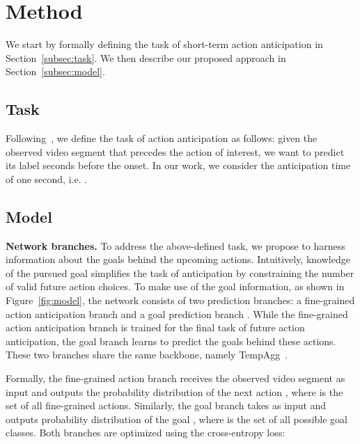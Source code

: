 \documentclass{article}
\begin{document}
\vspace{-0.2cm}
\section{Method}
\vspace{-0.1cm}
\label{sec:method}
We start by formally defining the task of short-term action anticipation in Section~\ref{subsec:task}. We then describe our proposed approach in Section~\ref{subsec:model}. 
\vspace{-0.3cm}
\subsection{Task}
\vspace{-0.1cm}
\label{subsec:task}
Following~\cite{sener2020temporal, furnari2020rulstm}, we define the task of action anticipation as follows: given the observed video segment  that precedes the action of interest, we want to predict its label  seconds before the onset. In our work, we consider the anticipation time of one second, i.e. .
\vspace{-0.2cm}
\subsection{Model}
\vspace{-0.1cm}
\label{subsec:model}
\textbf{Network branches.} To address the above-defined task, we propose to harness information about the goals behind the upcoming actions. Intuitively, knowledge of the pursued goal simplifies the task of anticipation by constraining the number of valid future action choices.
To make use of the goal information, as shown in Figure~\ref{fig:model}, the network consists of two prediction branches: a fine-grained action anticipation branch  and a goal prediction branch . 
While the fine-grained action anticipation branch is trained for the final task of future action anticipation, the goal branch learns to predict the goals behind these actions. These two branches share the same backbone, namely TempAgg~\cite{sener2020temporal}.

Formally, the fine-grained action branch  receives the observed video segment  as input and outputs the probability distribution of the next action , where  is the set of all fine-grained actions. Similarly, the goal branch  takes  as input and outputs probability distribution of the goal , where  is the set of all possible goal classes. Both branches are optimized using the cross-entropy loss:
\end{document}
